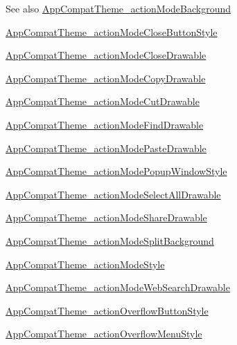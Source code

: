 \begin{DoxySeeAlso}{See also}
\hyperlink{classproject4_1_1xaria_1_1R_1_1styleable_a1456e2fb73b019f4b692d2ba615b5933}{App\+Compat\+Theme\+\_\+action\+Mode\+Background} 

\hyperlink{classproject4_1_1xaria_1_1R_1_1styleable_a8f8cf06f9ecf3ab9f45c305f87f20707}{App\+Compat\+Theme\+\_\+action\+Mode\+Close\+Button\+Style} 

\hyperlink{classproject4_1_1xaria_1_1R_1_1styleable_a2985c0df6c42837198bb3acd6f1017e8}{App\+Compat\+Theme\+\_\+action\+Mode\+Close\+Drawable} 

\hyperlink{classproject4_1_1xaria_1_1R_1_1styleable_a22f8d7130857992c2c71953f7ab16efb}{App\+Compat\+Theme\+\_\+action\+Mode\+Copy\+Drawable} 

\hyperlink{classproject4_1_1xaria_1_1R_1_1styleable_aaaa9698521dccac48903def6aa3f1607}{App\+Compat\+Theme\+\_\+action\+Mode\+Cut\+Drawable} 

\hyperlink{classproject4_1_1xaria_1_1R_1_1styleable_a583749c75ba069fcac9c2290f3422f99}{App\+Compat\+Theme\+\_\+action\+Mode\+Find\+Drawable} 

\hyperlink{classproject4_1_1xaria_1_1R_1_1styleable_a39092e8a0c13ec2bfb8555ab61ff14d1}{App\+Compat\+Theme\+\_\+action\+Mode\+Paste\+Drawable} 

\hyperlink{classproject4_1_1xaria_1_1R_1_1styleable_a417ee14da32163c43ef73a9115b2a4e8}{App\+Compat\+Theme\+\_\+action\+Mode\+Popup\+Window\+Style} 

\hyperlink{classproject4_1_1xaria_1_1R_1_1styleable_aff61e2a5924190bb7479ef2b13c8c7c0}{App\+Compat\+Theme\+\_\+action\+Mode\+Select\+All\+Drawable} 

\hyperlink{classproject4_1_1xaria_1_1R_1_1styleable_ac049b8452b5594eff2fe1f6122e11e61}{App\+Compat\+Theme\+\_\+action\+Mode\+Share\+Drawable} 

\hyperlink{classproject4_1_1xaria_1_1R_1_1styleable_a9e837df09f706dbb1c0d790a493f48ba}{App\+Compat\+Theme\+\_\+action\+Mode\+Split\+Background} 

\hyperlink{classproject4_1_1xaria_1_1R_1_1styleable_aa1cbbb6e6f07e19dfc6810cf2e89f0f0}{App\+Compat\+Theme\+\_\+action\+Mode\+Style} 

\hyperlink{classproject4_1_1xaria_1_1R_1_1styleable_a018f76fc0960147c4ef1591a74a324cc}{App\+Compat\+Theme\+\_\+action\+Mode\+Web\+Search\+Drawable} 

\hyperlink{classproject4_1_1xaria_1_1R_1_1styleable_abb732edffcf1b36c734cb674eb0a4092}{App\+Compat\+Theme\+\_\+action\+Overflow\+Button\+Style} 

\hyperlink{classproject4_1_1xaria_1_1R_1_1styleable_a51ca3492a0dc1ccc3966dd4a59665a62}{App\+Compat\+Theme\+\_\+action\+Overflow\+Menu\+Style} 


\end{DoxySeeAlso}
